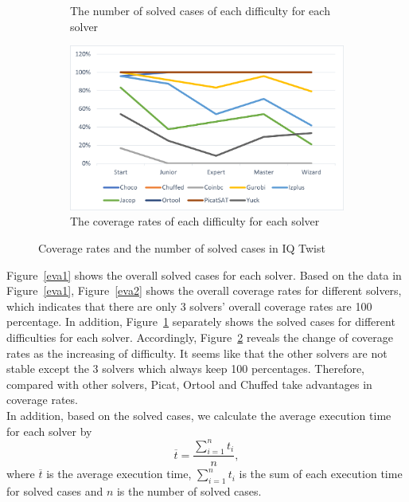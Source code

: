 \begin{figure}[htbp]
\begin{subfigure}[b]{0.48\textwidth}
    \caption{The number of solved cases of each difficulty for each solver}
    \label{eva3}
    \end{subfigure}
    \begin{subfigure}[b]{0.48\textwidth}
    \includegraphics[width=\textwidth]{figs/separated coverage.png}
    \caption{The coverage rates of each difficulty for each solver}
    \label{eva4}
    \end{subfigure}
    \caption{Coverage rates and the number of solved cases in IQ Twist}
    \label{fig:comparisonIQtwist}
\end{figure}
Figure~\ref{eva1} shows the overall solved cases for each solver. Based on the data in Figure~\ref{eva1}, Figure~\ref{eva2} shows the overall coverage rates for different solvers, which indicates that there are only 3 solvers' overall coverage rates are 100 percentage. In addition, Figure~\ref{eva3} separately shows the solved cases for different difficulties for each solver. Accordingly, Figure~\ref{eva4} reveals the change of coverage rates as the increasing of difficulty. It seems like that the other solvers are not stable except the 3 solvers which always keep 100 percentages. Therefore, compared with other solvers, Picat, Ortool and Chuffed take advantages in coverage rates.
\\In addition, based on the solved cases, we calculate the average execution time for each solver by
\begin{equation}
\overline{t}=\frac{\sum\limits_{i=1}^n t_{i}}{n},
\end{equation}
where $\overline{t}$ is the average execution time, $\sum\limits_{i=1}^n t_{i}$ is the sum of each execution time for solved cases and $n$ is the number of solved cases.
